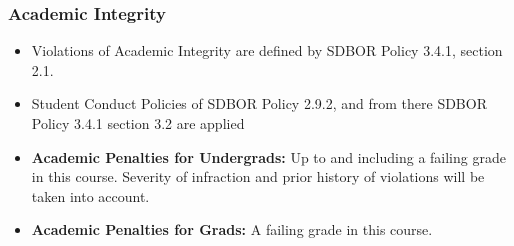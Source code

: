 \begin{frame}
  \frametitle{Academic Integrity}

  \begin{itemize}
  \item[\(\rightarrow\)] Violations of Academic Integrity are defined by SDBOR Policy 3.4.1, section 2.1.
  \item[\(\rightarrow\)] Student Conduct Policies of SDBOR Policy 2.9.2, and from there SDBOR Policy 3.4.1 section 3.2 are applied
    \vspace{1em}
  \item \textbf{Academic Penalties for Undergrads:} Up to and including a failing grade in this course.
    Severity of infraction and prior history of violations will be taken into account.
  \item \textbf{Academic Penalties for Grads:} A failing grade in this course.
  \end{itemize}
  
\end{frame}
